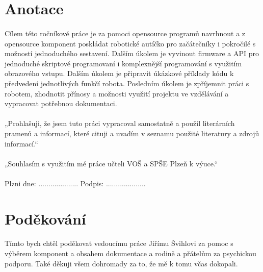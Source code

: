 \documentclass[12pt, a4paper]{article}
\begin{document}
	
	\thispagestyle{empty}
	
	\newpage
	\thispagestyle{empty}
	\section*{Anotace}
	\paragraph{} Cílem této ročníkové práce je za pomoci opensource programů navrhnout a z opensource komponent poskládat robotické autíčko pro začátečníky i pokročilé s možností jednoduchého sestavení. Dalším úkolem je vyvinout firmware a API pro jednoduché skriptové programovaní i komplexnější programování s využitím obrazového vstupu. Dalším úkolem je připravit úkázkové příklady kódu k předvedení jednotlivých funkčí robota. Posledním úkolem je zpříjemnit práci s robotem, zhodnotit přínosy a možnosti využití projektu ve vzdělávání a vypracovat potřebnou dokumentaci.
	\vfill
	\paragraph{} „Prohlašuji, že jsem tuto práci vypracoval samostatně a použil literárních pramenů a informací, které cituji a uvadím v seznamu použité literatury a zdrojů informací.“
	\paragraph{} „Souhlasím s využitím mé práce učteli VOŠ a SPŠE Plzeň k výuce.“
	\paragraph{} \hfill Plzni dne: .................... Podpis: ....................
	
	\newpage
	\thispagestyle{empty}
	\section*{Poděkování}
	\paragraph{} Tímto bych chtěl poděkovat vedoucímu práce Jiřímu Švihlovi za pomoc s výběrem komponent a obsahem dokumentace a rodině a přátelům za psychickou podporu. Také děkuji všem dohromady za to, že mě k tomu včas dokopali.
	
\end{document}
